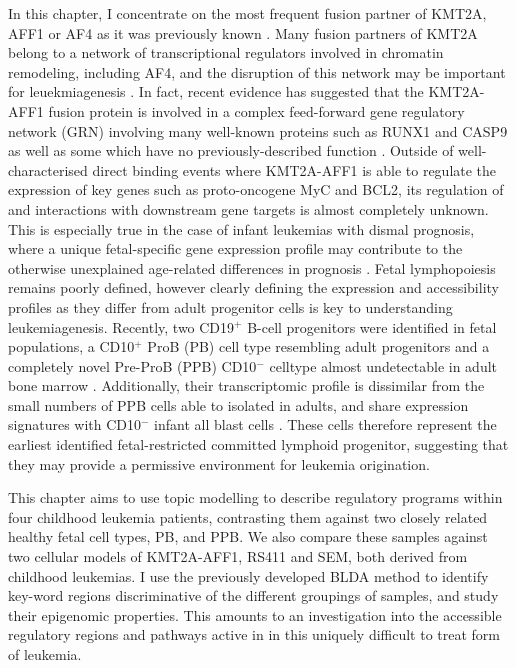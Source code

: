 In this chapter, I concentrate on the most frequent fusion partner of KMT2A, AFF1 or AF4 as it was previously known \cite{Meyer2017}. Many fusion partners of KMT2A belong to a network of transcriptional regulators involved in chromatin remodeling, including AF4, and the disruption of this network may be important for leuekmiagenesis \cite{Erfurth2003}. In fact, recent evidence has suggested that the KMT2A-AFF1 fusion protein is involved in a complex feed-forward gene regulatory network (GRN) involving many well-known proteins such as RUNX1 and CASP9 as well as some which have no previously-described function \cite{Harman2021, Wilkinson2013}. Outside of well-characterised direct binding events where KMT2A-AFF1 is able to regulate the expression of key genes such as proto-oncogene MyC and BCL2, its regulation of and interactions with downstream gene targets is almost completely unknown. This is especially true in the case of infant leukemias with dismal prognosis, where a unique fetal-specific gene expression profile may contribute to the otherwise unexplained age-related differences in prognosis \cite{Rice2020a}. Fetal lymphopoiesis remains poorly defined, however clearly defining the expression and accessibility profiles as they differ from adult progenitor cells is key to understanding leukemiagenesis. Recently, two CD19$^+$ B-cell progenitors were identified in fetal populations, a CD10$^+$ ProB (PB) cell type resembling adult progenitors and a completely novel Pre-ProB (PPB) CD10$^-$ celltype almost undetectable in adult bone marrow \cite{OByrne2019}. Additionally, their transcriptomic profile is dissimilar from the small numbers of PPB cells able to isolated in adults, and share expression signatures with CD10$^-$ infant \gls{all} blast cells \cite{OByrne2019}. These cells therefore represent the earliest identified fetal-restricted committed lymphoid progenitor, suggesting that they may provide a permissive environment for leukemia origination.  

This chapter aims to use topic modelling to describe regulatory programs within four childhood leukemia patients, contrasting them against two closely related healthy fetal cell types, PB, and PPB. We also compare these samples against two cellular models of KMT2A-AFF1, RS411 and SEM, both derived from childhood leukemias. I use the previously developed BLDA method to identify key-word regions discriminative of the different groupings of samples, and study their epigenomic properties. This amounts to an investigation into the accessible regulatory regions and pathways active in in this uniquely difficult to treat form of leukemia. 

